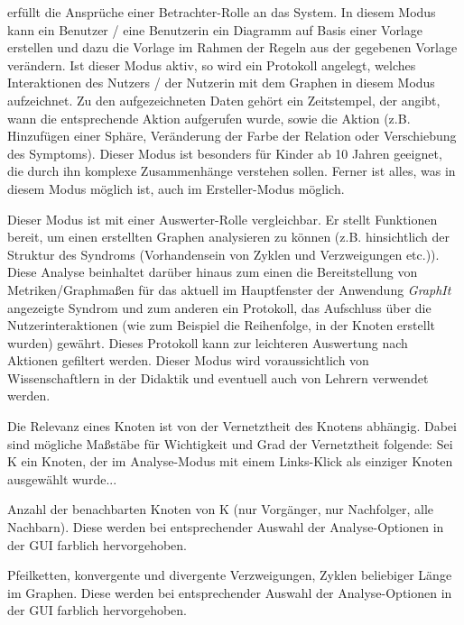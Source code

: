 \documentclass[enabledeprecatedfontcommands,fontsize=11pt,paper=a4,twoside]{scrartcl}
\newcounter{one}
\newcounter{two}[one]
\let\tempone\itemize
\let\temptwo\enditemize
\renewenvironment{itemize}{\tempone\addtolength{\itemsep}{-10.0pt}}{\temptwo}
\begin{document}
\begin{description}
	\item[Bearbeiter- Modus] erfüllt die Ansprüche einer Betrachter-Rolle an das System. In diesem Modus kann ein Benutzer / eine Benutzerin ein Diagramm auf Basis einer Vorlage erstellen und dazu die Vorlage im Rahmen der Regeln aus der gegebenen Vorlage verändern. Ist dieser Modus aktiv, so wird ein Protokoll angelegt, welches Interaktionen des Nutzers / der Nutzerin mit dem Graphen in diesem Modus aufzeichnet. Zu den aufgezeichneten Daten gehört ein Zeitstempel, der angibt, wann die entsprechende Aktion aufgerufen wurde, sowie die Aktion (z.B. Hinzufügen einer Sphäre, Veränderung der Farbe der Relation oder Verschiebung des Symptoms). Dieser Modus ist besonders für Kinder ab 10 Jahren geeignet, die durch ihn komplexe Zusammenhänge verstehen sollen. Ferner ist alles, was in diesem Modus möglich ist, auch im Ersteller-Modus möglich.
	\item[Analyse- Modus] Dieser Modus ist mit einer Auswerter-Rolle vergleichbar. Er stellt Funktionen bereit, um einen erstellten Graphen analysieren zu können (z.B. hinsichtlich der Struktur des Syndroms (Vorhandensein von Zyklen und Verzweigungen etc.)). Diese Analyse beinhaltet darüber hinaus zum einen die Bereitstellung von Metriken/Graphmaßen für das aktuell im Hauptfenster der Anwendung \textit{GraphIt} angezeigte Syndrom und zum anderen ein Protokoll, das Aufschluss über die Nutzerinteraktionen (wie zum Beispiel die Reihenfolge, in der Knoten erstellt wurden) gewährt. Dieses Protokoll kann zur leichteren Auswertung nach Aktionen gefiltert werden. Dieser Modus wird voraussichtlich von Wissenschaftlern in der Didaktik und eventuell auch von Lehrern verwendet werden.
	\item[Bedeutung eines Knoten] Die Relevanz eines Knoten ist von der Vernetztheit des Knotens abhängig. Dabei sind mögliche Maßstäbe für Wichtigkeit und Grad der Vernetztheit folgende: Sei K ein Knoten, der im Analyse-Modus mit einem Links-Klick als einziger Knoten ausgewählt wurde... 	
		\begin{itemize}
			\setlength{\itemsep}{0.5pt}
			\item Anzahl der benachbarten Knoten von K (nur Vorgänger, nur Nachfolger, alle Nachbarn). Diese werden bei entsprechender Auswahl der Analyse-Optionen in der GUI farblich hervorgehoben.
			\item Pfeilketten, konvergente und divergente Verzweigungen, Zyklen beliebiger Länge im Graphen. Diese werden bei entsprechender Auswahl der Analyse-Optionen in der GUI farblich hervorgehoben.
		\end{itemize}

\end{description}
\end{document}
